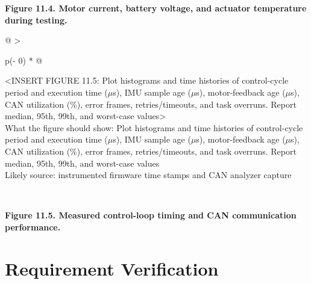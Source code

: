 \begin{center}\singlespacing
{}
\textbf{Figure 11.4. Motor current, battery voltage, and actuator temperature during testing.}
\end{center}

\begin{longtable}[]{@{}
  >{\raggedright\arraybackslash}p{(\columnwidth - 0\tabcolsep) * }@{}}
\toprule\noalign{}
\begin{minipage}[b]{\linewidth}\raggedright
\textless INSERT FIGURE 11.5: Plot histograms and time histories of
control-cycle period and execution time (\ensuremath{\mu}s), IMU sample age (\ensuremath{\mu}s),
motor-feedback age (\ensuremath{\mu}s), CAN utilization (\%), error frames,
retries\slash{}timeouts, and task overruns. Report median, 95th, 99th, and
worst-case values\textgreater{}\\
What the figure should show: Plot histograms and time histories of
control-cycle period and execution time (\ensuremath{\mu}s), IMU sample age (\ensuremath{\mu}s),
motor-feedback age (\ensuremath{\mu}s), CAN utilization (\%), error frames,
retries\slash{}timeouts, and task overruns. Report median, 95th, 99th, and
worst-case values\\
Likely source: instrumented firmware time stamps and CAN analyzer
capture\strut
\end{minipage} \\
\midrule\noalign{}
\endhead
\bottomrule\noalign{}
\endlastfoot
\end{longtable}

\begin{center}\singlespacing
{}
\textbf{Figure 11.5. Measured control-loop timing and CAN communication performance.}
\end{center}

\section{Requirement Verification}\label{requirement-verification}

